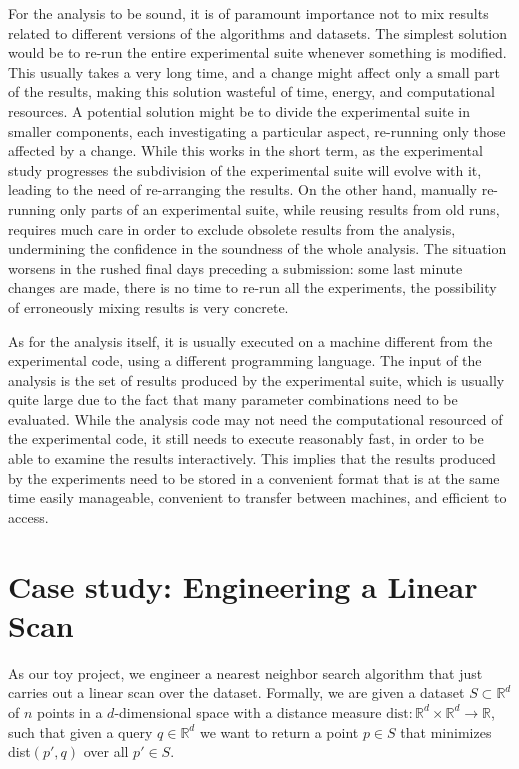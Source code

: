 \documentclass{llncs}
\begin{document}
For the analysis to be sound, it is of paramount importance not to 
mix results related to different versions
of the algorithms and datasets.
The simplest solution would be to re-run the entire experimental suite whenever
something is modified. 
This usually takes a very long time, and a change might affect 
only a small part of the results, making this solution wasteful of time, energy,
and computational resources.
A potential solution might be to divide the experimental suite in smaller
components, each investigating a particular aspect, re-running only those 
affected by a change.
While this works in the short term, as the experimental study progresses
the subdivision of the experimental suite will evolve with it, leading to the
need of re-arranging the results.
On the other hand, manually re-running only parts of an experimental suite,
while reusing results from old runs, requires much care in order to exclude
obsolete results from the analysis, undermining the confidence in the soundness
of the whole analysis.
The situation worsens in the rushed final days preceding a submission:
some last minute changes are made, there is no time to re-run all the experiments,
the possibility of erroneously mixing results is very concrete.

As for the analysis itself, it is usually executed on a machine different from the
experimental code, using a different programming language.
The input of the analysis is the set of results produced by the experimental suite,
which is usually quite large due to the fact that many parameter combinations
need to be evaluated.
While the analysis code may not need the computational resourced of the 
experimental code, it still needs to execute reasonably fast, in order to be able
to examine the results interactively.
This implies that the results produced by the experiments need to be 
stored in a convenient
format that is at the same time easily manageable, convenient to transfer between
machines, and efficient to access.


\section{Case study: Engineering a Linear Scan}

As our toy project, we engineer a nearest neighbor search algorithm that just carries out a linear scan over the dataset. 
Formally, we are given a dataset $S \subset \mathbb{R}^d$ of $n$ points in a $d$-dimensional space with a distance measure $\text{dist}\colon \mathbb{R}^d \times \mathbb{R}^d \rightarrow \mathbb{R}$, such that given a query $q \in \mathbb{R}^d$ we want to return a point $p \in S$ that minimizes dist$(p', q)$ over all $p' \in S$.
\end{document}
